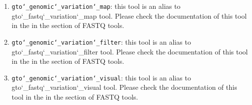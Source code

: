 \begin{enumerate}
\item \texttt{gto\char`_genomic\char`_variation\char`_map}: this tool is an alias to gto\char`_fastq\char`_variation\char`_map tool. Please check the documentation of this tool in the in the section of FASTQ tools. 

\item \texttt{gto\char`_genomic\char`_variation\char`_filter}: this tool is an alias to gto\char`_fastq\char`_variation\char`_filter tool. Please check the documentation of this tool in the in the section of FASTQ tools. 

\item \texttt{gto\char`_genomic\char`_variation\char`_visual}: this tool is an alias to gto\char`_fastq\char`_variation\char`_visual tool. Please check the documentation of this tool in the in the section of FASTQ tools. 

\end{enumerate}










